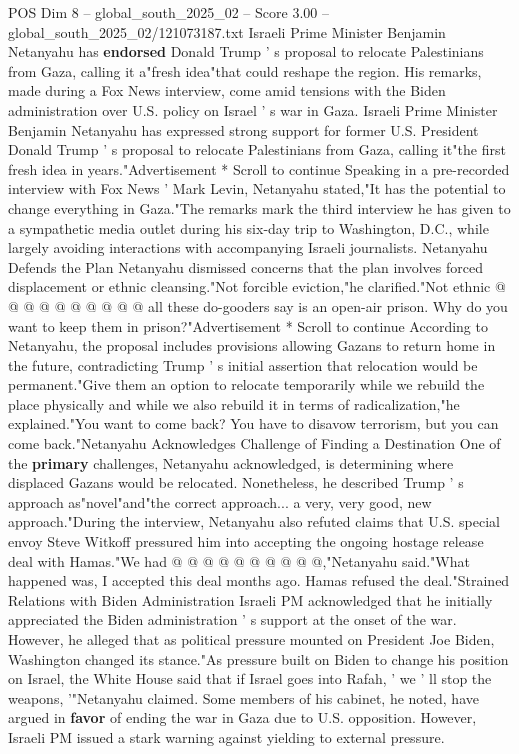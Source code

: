 \begin{textsample}{POS Dim 8 – global\_south\_2025\_02 – Score 3.00 – global\_south\_2025\_02/121073187.txt}  \label{ex:f8_pos_397}
Israeli Prime Minister Benjamin Netanyahu has \textbf{endorsed} Donald Trump ' s proposal to relocate Palestinians from Gaza, calling it a"fresh idea"that could reshape the region.
His remarks, made during a Fox News interview, come amid tensions with the Biden administration over U.S. policy on Israel ' s war in Gaza.
Israeli Prime Minister Benjamin Netanyahu has expressed strong support for former U.S.
President Donald Trump ' s proposal to relocate Palestinians from Gaza, calling it"the first fresh idea in years."Advertisement * Scroll to continue Speaking in a pre-recorded interview with Fox News ' Mark Levin, Netanyahu stated,"It has the potential to change everything in Gaza."The remarks mark the third interview he has given to a sympathetic media outlet during his six-day trip to Washington, D.C., while largely avoiding interactions with accompanying Israeli journalists.
Netanyahu Defends the Plan Netanyahu dismissed concerns that the plan involves forced displacement or ethnic cleansing."Not forcible eviction,"he clarified."Not ethnic @ @ @ @ @ @ @ @ @ @ all these do-gooders say is an open-air prison.
Why do you want to keep them in prison?"Advertisement * Scroll to continue According to Netanyahu, the proposal includes provisions allowing Gazans to return home in the future, contradicting Trump ' s initial assertion that relocation would be permanent."Give them an option to relocate temporarily while we rebuild the place physically and while we also rebuild it in terms of radicalization,"he explained."You want to come back?
You have to disavow terrorism, but you can come back."Netanyahu Acknowledges Challenge of Finding a Destination One of the \textbf{primary} challenges, Netanyahu acknowledged, is determining where displaced Gazans would be relocated.
Nonetheless, he described Trump ' s approach as"novel"and"the correct approach... a very, very good, new approach."During the interview, Netanyahu also refuted claims that U.S. special envoy Steve Witkoff pressured him into accepting the ongoing hostage release deal with Hamas."We had @ @ @ @ @ @ @ @ @ @,"Netanyahu said."What happened was, I accepted this deal months ago.
Hamas refused the deal."Strained Relations with Biden Administration Israeli PM acknowledged that he initially appreciated the Biden administration ' s support at the onset of the war.
However, he alleged that as political pressure mounted on President Joe Biden, Washington changed its stance."As pressure built on Biden to change his position on Israel, the White House said that if Israel goes into Rafah, ' we ' ll stop the weapons, '"Netanyahu claimed.
Some members of his cabinet, he noted, have argued in \textbf{favor} of ending the war in Gaza due to U.S. opposition.
However, Israeli PM issued a stark warning against yielding to external pressure.

\end{textsample}
